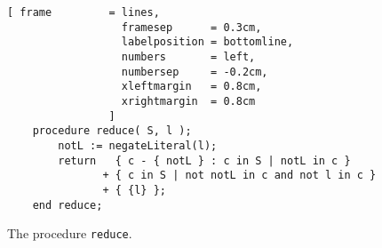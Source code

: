 \begin{figure}[!ht]
  \centering
\begin{Verbatim}[ frame         = lines, 
                  framesep      = 0.3cm, 
                  labelposition = bottomline,
                  numbers       = left,
                  numbersep     = -0.2cm,
                  xleftmargin   = 0.8cm,
                  xrightmargin  = 0.8cm
                ]
    procedure reduce( S, l );
        notL := negateLiteral(l);
        return   { c - { notL } : c in S | notL in c } 
               + { c in S | not notL in c and not l in c } 
               + { {l} };
    end reduce;
\end{Verbatim}
\vspace*{-0.3cm}
  \caption{The procedure \texttt{reduce}.}
  \label{fig:reduce}
\end{figure} 

